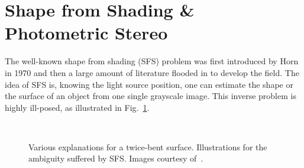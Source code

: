 \section{Shape from Shading \& Photometric Stereo}

The well-known shape from shading (SFS) problem was first introduced by Horn~\cite{horn1970shape} in 1970 and then a large amount of literature flooded in to develop the field.
The idea of SFS is, knowing the light source position, one can estimate the shape or the surface of an object from one single grayscale image.
This inverse problem is highly ill-posed, as illustrated in Fig.~\ref{fig:paint}.


\begin{figure}[!ht]
\centering
{}
\\
\caption{Various explanations for a twice-bent surface. Illustrations for the ambiguity suffered by SFS. Images courtesy of~\cite{adelson1996perception}.}
\label{fig:paint}
\end{figure}


